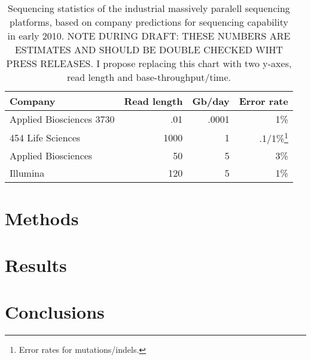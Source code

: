 \documentclass{article}
\begin{document}
\begin{table}
\begin{tabular}{lrrr}
Company & Read length & Gb/day & Error rate \\
\hline
Applied Biosciences 3730   & .01 & .0001 & 1\% \\
454 Life Sciences   & 1000 & 1 & .1/1\%\footnote{Error rates for mutations/indels.} \\
Applied Biosciences & 50   & 5 & 3\% \\
Illumina            & 120  & 5 & 1\% 
\end{tabular}
\caption{Sequencing statistics of the industrial massively paralell
  sequencing platforms, based on company predictions for sequencing
  capability in early 2010.  NOTE DURING DRAFT: THESE NUMBERS ARE
  ESTIMATES AND SHOULD BE DOUBLE CHECKED WIHT PRESS RELEASES.  I
  propose replacing this chart with two y-axes, read length and base-throughput/time.}
\label{tab:PlatformStatistics}
\end{table}





\section{Methods}



\section{Results}




\section{Conclusions}






\end{document}

